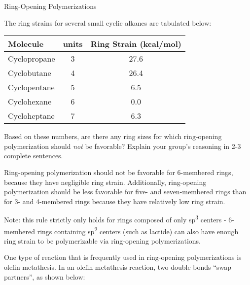 \begin{activity}{Ring-Opening Polymerizations}
\begin{infobox}
	The ring strains for several small cyclic alkanes are tabulated below:
	\begin{center}
	\begin{tabular}{lcc}
		\hline		
		Molecule & \ce{CH2} units & Ring Strain (kcal/mol)\\\hline
		Cyclopropane & 3 & 27.6\\
		Cyclobutane & 4 & 26.4\\
		Cyclopentane & 5 & 6.5\\
		Cyclohexane & 6 & 0.0\\
		Cycloheptane & 7 & 6.3\\
	\end{tabular}
	\end{center}

\end{infobox}

\begin{ctqs}

	\question Based on these numbers, are there any ring sizes for which ring-opening polymerization should \emph{not} be favorable?  Explain your group's reasoning in 2-3 complete sentences. \label{\labelbase:ctq:ringsizes}
			
				\begin{solution}[2in]
					Ring-opening polymerization should not be favorable for 6-membered rings, because they have negligible ring strain.  Additionally, ring-opening polymerization should be less favorable for five- and seven-membered rings than for 3- and 4-membered rings because they have relatively low ring strain.
					
					Note: this rule strictly only holds for rings composed of only sp\textsuperscript{3} centers - 6-membered rings containing sp\textsuperscript{2} centers (such as lactide) can also have enough ring strain to be polymerizable via ring-opening polymerizations.
				\end{solution}

\end{ctqs}

\clearpage
\begin{model}
	\label{\labelbase:mdl:ROMP}

	One type of reaction that is frequently used in ring-opening polymerizations is olefin metathesis.
	In an olefin metathesis reaction, two double bonds ``swap partners'', as shown below:
	

\end{model}
\end{activity}

